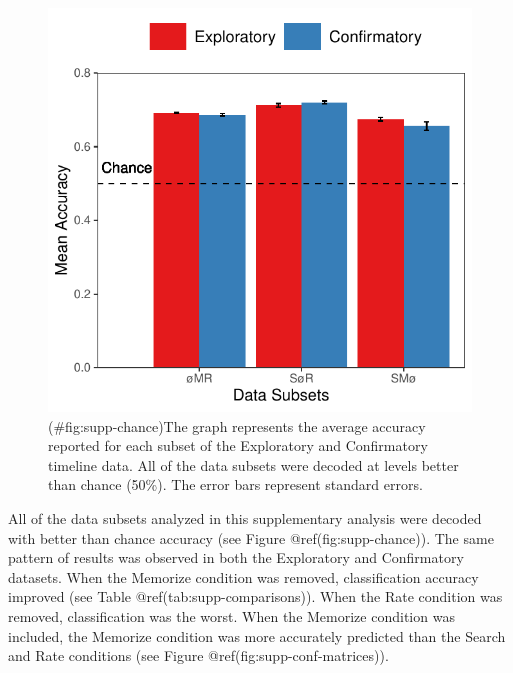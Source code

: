 \begin{appendix}
\begin{figure}
\centering
\includegraphics{supplementary_analysis/supp_subset_chance.pdf}
\caption{(\#fig:supp-chance)The graph represents the average accuracy
reported for each subset of the Exploratory and Confirmatory timeline
data. All of the data subsets were decoded at levels better than chance
(50\%). The error bars represent standard errors.}
\end{figure}

All of the data subsets analyzed in this supplementary analysis were
decoded with better than chance accuracy (see Figure
@ref(fig:supp-chance)). The same pattern of results was observed in both
the Exploratory and Confirmatory datasets. When the Memorize condition
was removed, classification accuracy improved (see Table
@ref(tab:supp-comparisons)). When the Rate condition was removed,
classification was the worst. When the Memorize condition was included,
the Memorize condition was more accurately predicted than the Search and
Rate conditions (see Figure @ref(fig:supp-conf-matrices)).


\end{appendix}
